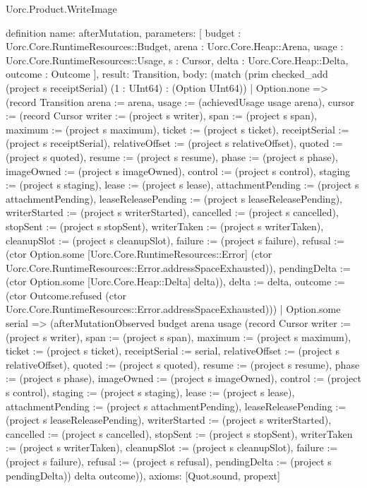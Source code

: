 \begin{lexlean}{Uorc.Product.WriteImage}
\begin{semanticmodule}
definition{
  name: afterMutation,
  parameters: [
    budget : Uorc.Core.RuntimeResources::Budget,
    arena : Uorc.Core.Heap::Arena,
    usage : Uorc.Core.RuntimeResources::Usage,
    s : Cursor,
    delta : Uorc.Core.Heap::Delta,
    outcome : Outcome
  ],
  result: Transition,
  body: (match (prim checked_add (project s receiptSerial) (1 : UInt64) : (Option UInt64))
    | Option.none => (record Transition {arena := arena, usage := (achievedUsage usage arena), cursor := (record Cursor {writer := (project s writer), span := (project s span), maximum := (project s maximum), ticket := (project s ticket), receiptSerial := (project s receiptSerial), relativeOffset := (project s relativeOffset), quoted := (project s quoted), resume := (project s resume), phase := (project s phase), imageOwned := (project s imageOwned), control := (project s control), staging := (project s staging), lease := (project s lease), attachmentPending := (project s attachmentPending), leaseReleasePending := (project s leaseReleasePending), writerStarted := (project s writerStarted), cancelled := (project s cancelled), stopSent := (project s stopSent), writerTaken := (project s writerTaken), cleanupSlot := (project s cleanupSlot), failure := (project s failure), refusal := (ctor Option.some [Uorc.Core.RuntimeResources::Error] (ctor Uorc.Core.RuntimeResources::Error.addressSpaceExhausted)), pendingDelta := (ctor Option.some [Uorc.Core.Heap::Delta] delta)}), delta := delta, outcome := (ctor Outcome.refused (ctor Uorc.Core.RuntimeResources::Error.addressSpaceExhausted))})
    | Option.some serial => (afterMutationObserved budget arena usage (record Cursor {writer := (project s writer), span := (project s span), maximum := (project s maximum), ticket := (project s ticket), receiptSerial := serial, relativeOffset := (project s relativeOffset), quoted := (project s quoted), resume := (project s resume), phase := (project s phase), imageOwned := (project s imageOwned), control := (project s control), staging := (project s staging), lease := (project s lease), attachmentPending := (project s attachmentPending), leaseReleasePending := (project s leaseReleasePending), writerStarted := (project s writerStarted), cancelled := (project s cancelled), stopSent := (project s stopSent), writerTaken := (project s writerTaken), cleanupSlot := (project s cleanupSlot), failure := (project s failure), refusal := (project s refusal), pendingDelta := (project s pendingDelta)}) delta outcome)),
  axioms: [Quot.sound, propext]
}


\end{semanticmodule}
\end{lexlean}
